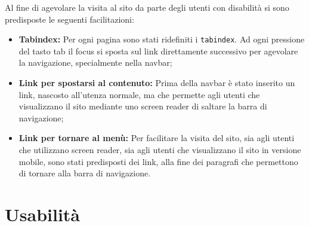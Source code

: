 Al fine di agevolare la visita al sito da parte degli utenti con disabilità si sono predisposte le seguenti facilitazioni:
\begin{itemize}
\item \textbf{Tabindex:} Per ogni pagina sono stati ridefiniti i \texttt{tabindex}. Ad ogni pressione del tasto tab il focus si sposta sul link direttamente successivo per agevolare la navigazione, specialmente nella navbar;
\item \textbf{Link per spostarsi al contenuto:} Prima della navbar è stato inserito un link, nascosto all'utenza normale, ma che permette agli utenti che visualizzano il sito mediante uno screen reader di saltare la barra di navigazione;
\item \textbf{Link per tornare al menù:} Per facilitare la visita del sito, sia agli utenti che utilizzano screen reader, sia agli utenti che visualizzano il sito in versione mobile, sono stati predisposti dei link, alla fine dei paragrafi che permettono di tornare alla barra di navigazione.
\end{itemize}


\section{Usabilità}


